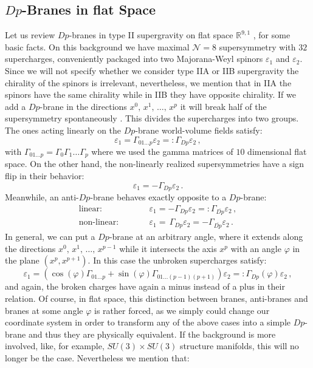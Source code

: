 \documentclass[a4paper,12pt]{report}
\newcommand{\be}{\begin{equation}}
\newcommand{\ee}{\end{equation}}
\begin{document}
\subsection{$Dp$-Branes in flat Space}
\label{sec:flatspacebranes}
Let us review $Dp$-branes in type II supergravity on flat space $\mathbb{R}^{9,1}$ \cite{Polchinski:1998rr,Cederwall:1996pv,Aganagic:1996pe,Cederwall:1996ri,Bergshoeff:1996tu,Aganagic:1996nn}, for some basic facts. On this background we have maximal $\mathcal{N}=8$ supersymmetry with $32$ supercharges, conveniently packaged into two Majorana-Weyl spinors $\varepsilon_1$ and $\varepsilon_2$. Since we will not specify whether we consider type IIA or IIB supergravity the chirality of the spinors is irrelevant, nevertheless, we mention that in IIA the spinors have the same chirality while in IIB they have opposite chirality. If we add a $Dp$-brane in the directions $x^0,\,x^1,\,\ldots,\,x^p$ it will break half of the supersymmetry spontaneously \cite{Polchinski:1998rr}. This divides the supercharges into two groups. The ones acting linearly on the $Dp$-brane world-volume fields satisfy:
\be 
\varepsilon_1 = \Gamma_{01\ldots p} \varepsilon_2 =: \Gamma_{Dp}\varepsilon_2\,,
\ee
with $\Gamma_{01\ldots p} = \Gamma_0 \Gamma_1 \ldots \Gamma_p$ where we used the gamma matrices of $10$ dimensional flat space. On the other hand, the non-linearly realized supersymmetries have a sign flip in their behavior:
\be 
\varepsilon_1 = -\Gamma_{Dp}\varepsilon_2\,.
\ee
Meanwhile, an anti-$Dp$-brane behaves exactly opposite to a $Dp$-brane:
\be
\begin{matrix}
\text{linear:} & \qquad &\varepsilon_1 = - \Gamma_{Dp} \varepsilon_2 =: \Gamma_{\overline{Dp}} \varepsilon_2\,,\\
\text{non-linear:} & &\varepsilon_1 = \, \Gamma_{Dp} \varepsilon_2 = -\Gamma_{\overline{Dp}} \varepsilon_2\,.
\end{matrix}
\ee
In general, we can put a $Dp$-brane at an arbitrary angle, where it extends along the directions $x^0,\,x^1,\,\ldots ,\, x^{p-1}$ while it intersects the axis $x^p$ with an angle $\varphi$ in the plane $(x^p,x^{p+1})$. In this case the unbroken supercharges satisfy:
\be 
\varepsilon_1 = \left(\cos (\varphi) \Gamma_{01\ldots p} + \sin (\varphi) \Gamma_{01\ldots(p-1)(p+1)} \right)\varepsilon_2 =: \Gamma_{Dp}(\varphi) \varepsilon_2\,,
\ee
and again, the broken charges have again a minus instead of a plus in their relation. Of course, in flat space, this distinction between branes, anti-branes and branes at some angle $\varphi$ is rather forced, as we simply could change our coordinate system in order to transform any of the above cases into a simple $Dp$-brane and thus they are physically equivalent. If the background is more involved, like, for example,  $SU(3)\times SU(3)$ structure manifolds, this will no longer be the case. Nevertheless we mention that:
\end{document}
